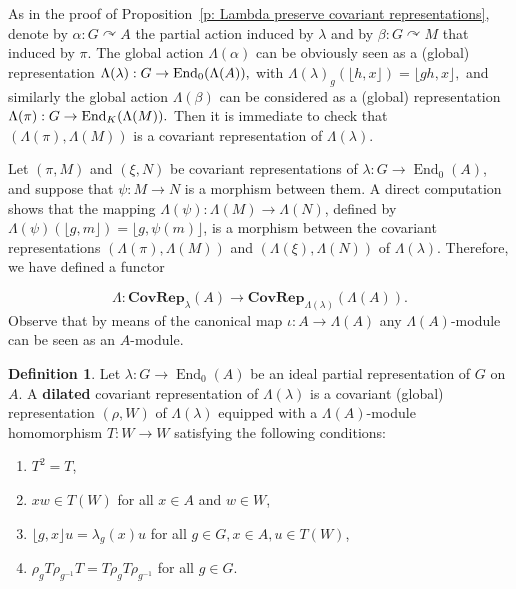 \documentclass[11pt]{amsart}
\numberwithin{equation}{section}
\theoremstyle{definition}
\newtheorem{definition}[theorem]{Definition}
\theoremstyle{remark}
\begin{document}
 As in the proof of Proposition~\ref{p: Lambda preserve covariant representations}, denote by  $\alpha: G \curvearrowright A $  the partial action induced by $\lambda $ and by
$\beta: G \curvearrowright M $ that induced by $\pi .$ The global action $\Lambda (\alpha )$ can be obviously seen as a (global) representation 
$\Lambda (\lambda ) : G \to  {\rm End} _{0}(\Lambda (A)),$ with $\Lambda (\lambda )_g (\lfloor h, x  \rfloor)
= \lfloor gh, x  \rfloor,$ and similarly the global action $\Lambda (\beta)$ can be considered as a (global) representation $\Lambda (\pi ) : G \to  {\rm End}_K (\Lambda (M)).$ Then it is immediate to check that $(\Lambda(\pi), \Lambda(M))$ is a covariant representation of $\Lambda (\lambda ).$
 


    

Let  $(\pi, M)$ and $(\xi, N)$ be  covariant representations of $\lambda: G \to \operatorname{End}_0(A)$, and suppose that $\psi: M \to N$ is a morphism between them. A direct computation shows that the mapping $\Lambda(\psi): \Lambda(M) \to \Lambda(N)$, defined by $\Lambda(\psi)(\lfloor g, m \rfloor) = \lfloor g, \psi(m) \rfloor$, is a morphism between the covariant representations $(\Lambda(\pi), \Lambda(M))$ and $(\Lambda(\xi), \Lambda(N))$ of $\Lambda(\lambda)$. Therefore, we have defined a functor 
 
\begin{equation}\label{eq functor Lambda}
  \Lambda: \textbf{CovRep}_{\lambda}(A) \to \textbf{CovRep}_{\Lambda (\lambda )}(\Lambda(A)).
\end{equation}
 Observe that by means of the canonical map $\iota : A \to \Lambda (A)$ any $\Lambda (A)$-module can be seen as an $A$-module.


\begin{definition}\label{d: dilated covrep}
    Let \(\lambda: G \to \operatorname{End}_0(A)\) be  an ideal  partial representation  of $G$ on $A$.
    A \textbf{dilated} covariant representation of   \( \Lambda (\lambda ) \)  is a covariant (global) representation \((\rho, W)\) of \(\Lambda(\lambda)\) equipped with a \(\Lambda(A)\)-module homomorphism \( T: W \to W \) satisfying the following conditions:
    \begin{enumerate}
        \item \( T^2 = T \),
        \item \( xw \in T(W) \) for all \( x \in A \) and \( w \in W \),
        \item \( \lfloor g, x \rfloor u = \lambda_g(x) u \) for all \( g \in G, x \in A, u \in T(W) \),
        \item \( \rho_g T \rho_{g^{-1}} T = T \rho_g T \rho_{g^{-1}} \) for all \( g \in G \).
    \end{enumerate}
\end{definition}
\end{document}
